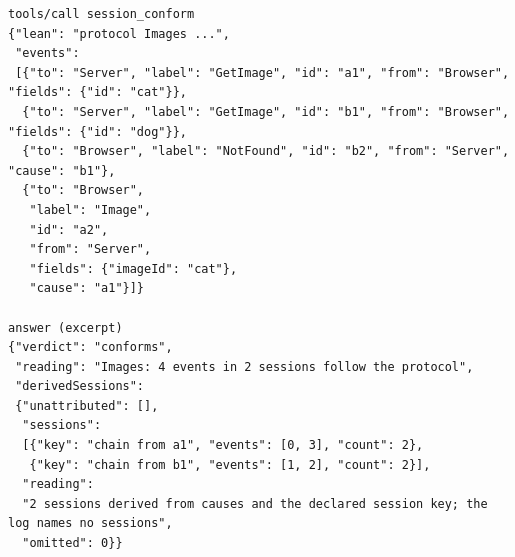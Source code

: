 \begin{lstlisting}[language={},basicstyle=\ttfamily\footnotesize,breaklines=true]
tools/call session_conform
{"lean": "protocol Images ...",
 "events":
 [{"to": "Server", "label": "GetImage", "id": "a1", "from": "Browser", "fields": {"id": "cat"}},
  {"to": "Server", "label": "GetImage", "id": "b1", "from": "Browser", "fields": {"id": "dog"}},
  {"to": "Browser", "label": "NotFound", "id": "b2", "from": "Server", "cause": "b1"},
  {"to": "Browser",
   "label": "Image",
   "id": "a2",
   "from": "Server",
   "fields": {"imageId": "cat"},
   "cause": "a1"}]}

answer (excerpt)
{"verdict": "conforms",
 "reading": "Images: 4 events in 2 sessions follow the protocol",
 "derivedSessions":
 {"unattributed": [],
  "sessions":
  [{"key": "chain from a1", "events": [0, 3], "count": 2},
   {"key": "chain from b1", "events": [1, 2], "count": 2}],
  "reading":
  "2 sessions derived from causes and the declared session key; the log names no sessions",
  "omitted": 0}}
\end{lstlisting}
